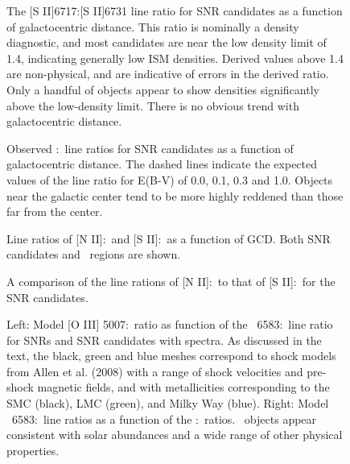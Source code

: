 \begin{figure}
\caption{The [S II]6717:[S II]6731 line ratio for SNR candidates as a function of galactocentric distance.  This ratio is nominally a density diagnostic, and most candidates are near the low density limit of 1.4, indicating generally low ISM densities. Derived values above 1.4 are non-physical, and are indicative of errors in the derived ratio.  Only a handful of objects appear to show densities significantly above the low-density limit.  There is no obvious trend with galactocentric distance.  \label{fig_s2_ratio}}
\end{figure}

\begin{figure}
\caption{Observed \hb:\ha\ line ratios for SNR candidates as a function of galactocentric distance. The dashed lines indicate the expected values of the line ratio for E(B-V) of 0.0, 0.1, 0.3 and 1.0.  Objects near the galactic center tend to be more highly reddened than those far from the center. \label{fig_reddening}}
\end{figure}

\begin{figure}
\caption{Line ratios of [N II]:\ha\ and [S II]:\ha\ as a function of GCD.  Both SNR candidates and \hii\ regions are shown.     \label{fig_metal_ratios}}

\end{figure}

\begin{figure}
\caption{A comparison of the line rations of [N II]:\ha\ to that of [S II]:\ha\ for the SNR candidates. \label{fig_s2_n2}}
\end{figure}


\begin{figure}
\caption{Left: Model [O III] 5007:\hb\ ratio as function of the \nii\ 6583:\ha\ line ratio for SNRs and SNR candidates with spectra. As discussed in the text, the black, green and blue meshes correspond to shock models from Allen et al. (2008) with a range of shock velocities and pre-shock magnetic fields, and with metallicities corresponding to the SMC (black), LMC (green), and Milky Way (blue).  Right: Model \nii\ 6583:\ha\ line ratios as a function of the \sii:\ha\ ratios.  \gal\ objects appear consistent with solar abundances and a wide range of other physical properties.  \label{fig_model}}
\end{figure}

